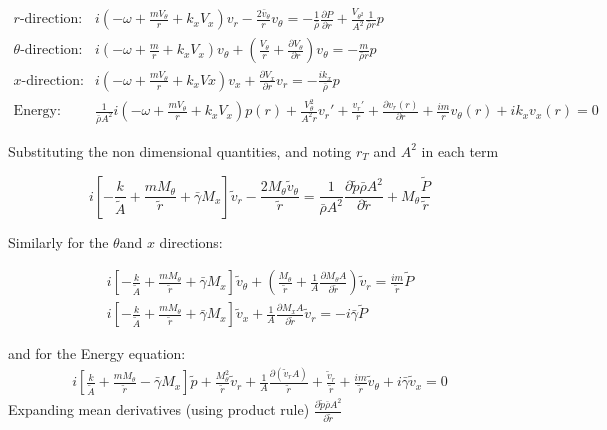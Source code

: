 \documentclass[12pt]{article}
\begin{document}
\begin{align*}
r\text{-direction: }& i\left(-\omega + \frac{ m V_{\theta}}{r} +  k_x V_x \right) v_r - \frac{2 \bar{v}_{\theta}}{r}v_{\theta}  = -\frac{1}{\bar{\rho}} \frac{\partial P}{\partial r}+ \frac{V_{\theta^2}}{A^2}\frac{1}{\bar{\rho} r}p\\
\theta\text{-direction: }& i\left(-\omega + \frac{ m}{r} +  k_x V_x \right) v_{\theta} + \left(\frac{V_{\theta}}{r} +  \frac{\partial V_{\theta}}{\partial r}\right)v_\theta= -\frac{m}{\bar{\rho}r}p \\ 
x\text{-direction: } &i\left(-\omega + \frac{mV_{\theta}}{r} +  k_xVx\right)v_x + \frac{\partial V_x}{\partial r} v_r = - \frac{i
	k_x}{\bar{\rho}}p\\
\text{Energy: }&\frac{1}{\bar{\rho} A^2} i\left(-\omega + \frac{mV_{\theta}}{r} + k_xV_x  
\right)p(r)  +
\frac{V_{\theta}^2}{A^2 r}v_r'+ \frac{v_r'}{r} +
\frac{\partial v_r(r)}{\partial r}+ 
\frac{im}{r} v_{\theta}(r)
+
ik_xv_x(r) 
= 0
\end{align*}

Substituting the non dimensional quantities, and noting $r_T$ and $A^2$ in each term

\[ i\left[ 
- \frac{k}{\tilde{A}} + 
\frac{m M_{\theta}}{\tilde{r}} + 
\bar{\gamma} M_x \right] 
\tilde{v}_r - 
\frac{2 M_{\theta} \tilde{v}_{\theta}}{\tilde{r}} = 
\frac{1}{\bar{\rho} A^2}\frac{\partial \tilde{p}\bar{\rho} A^2}{\partial \tilde{r}} + 
M_{\theta}\frac{\tilde{P}}{\tilde{r}}\]

Similarly for the $\theta$and $x$ directions:

\begin{align*}
	 i\left[ - \frac{k}{\tilde{A}} + \frac{m M_{\theta}}{\tilde{r}} + \bar{\gamma} M_x \right] \tilde{v}_{\theta} + \left(\frac{ M_{\theta}}{\tilde{r}}  + \frac{1}{A} \frac{\partial M_{\theta}A}{\partial \tilde{r}}\right)\tilde{v}_r = \frac{i m}{\tilde{r}}\tilde{P}\\
	 i\left[ - \frac{k}{\tilde{A}} + \frac{m M_{\theta}}{\tilde{r}} + \bar{\gamma} M_x \right] \tilde{v}_x  + \frac{1}{A} \frac{\partial M_x A}{\partial \tilde{r}}\tilde{v}_r = -i \bar{\gamma}\tilde{P}
\end{align*}

and for the Energy equation:
\begin{align*}
	 i \left[ \frac{k}{\tilde{A}} + 
	 \frac{mM_{\theta}}{\tilde{r}} - 
	 \bar{\gamma}M_x \right] \tilde{p} + 
	 \frac{M_{\theta}^2}{\tilde{r}}\tilde{v}_r + 
	 \frac{1}{A}\frac{\partial ( \tilde{v}_r A)}{\tilde{r}}+ 
	 \frac{\tilde{v}_r  }{\tilde{r}} + \frac{im}{\tilde{r}}\tilde{v}_\theta + i \bar{\gamma} \tilde{v}_x = 0
\end{align*}
\[\]
Expanding mean derivatives (using product rule) $\frac{\partial \tilde{p}\bar{\rho} A^2}{\partial \tilde{r}} $
\end{document}
